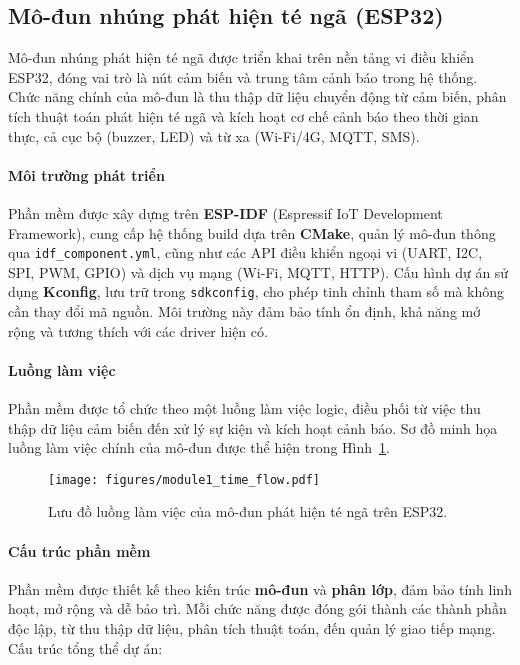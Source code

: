 
\subsection{Mô-đun nhúng phát hiện té ngã (ESP32)}
\label{sec:module_i}

Mô-đun nhúng phát hiện té ngã được triển khai trên nền tảng vi điều khiển ESP32, đóng vai trò là nút cảm biến và trung tâm cảnh báo trong hệ thống. Chức năng chính của mô-đun là thu thập dữ liệu chuyển động từ cảm biến, phân tích thuật toán phát hiện té ngã và kích hoạt cơ chế cảnh báo theo thời gian thực, cả cục bộ (buzzer, LED) và từ xa (Wi-Fi/4G, MQTT, SMS).

\paragraph{Môi trường phát triển}  
Phần mềm được xây dựng trên \textbf{ESP-IDF} (Espressif IoT Development Framework), cung cấp hệ thống build dựa trên \textbf{CMake}, quản lý mô-đun thông qua \texttt{idf\_component.yml}, cũng như các API điều khiển ngoại vi (UART, I2C, SPI, PWM, GPIO) và dịch vụ mạng (Wi-Fi, MQTT, HTTP). Cấu hình dự án sử dụng \textbf{Kconfig}, lưu trữ trong \texttt{sdkconfig}, cho phép tinh chỉnh tham số mà không cần thay đổi mã nguồn. Môi trường này đảm bảo tính ổn định, khả năng mở rộng và tương thích với các driver hiện có.

\paragraph{Luồng làm việc}  
Phần mềm được tổ chức theo một luồng làm việc logic, điều phối từ việc thu thập dữ liệu cảm biến đến xử lý sự kiện và kích hoạt cảnh báo. Sơ đồ minh họa luồng làm việc chính của mô-đun được thể hiện trong Hình~\ref{fig:module1_flow}.

\begin{figure}[h!]
    \centering
    \texttt{[image: figures/module1\_time\_flow.pdf]}
    \caption{Lưu đồ luồng làm việc của mô-đun phát hiện té ngã trên ESP32.}
    \label{fig:module1_flow}
\end{figure}

\paragraph{Cấu trúc phần mềm}  
Phần mềm được thiết kế theo kiến trúc \textbf{mô-đun} và \textbf{phân lớp}, đảm bảo tính linh hoạt, mở rộng và dễ bảo trì. Mỗi chức năng được đóng gói thành các thành phần độc lập, từ thu thập dữ liệu, phân tích thuật toán, đến quản lý giao tiếp mạng. Cấu trúc tổng thể dự án:

